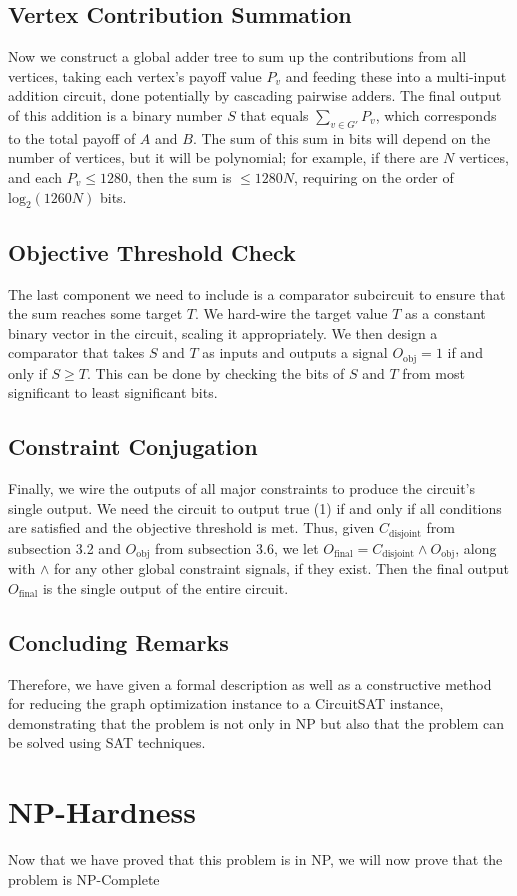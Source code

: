 \documentclass{article}
\begin{document}
\subsection{Vertex Contribution Summation}

Now we construct a global adder tree to sum up the contributions from all vertices, taking each vertex's payoff value $P_v$ and feeding these into a multi-input addition circuit, done potentially by cascading pairwise adders. The final output of this addition is a binary number $S$ that equals $\sum_{v \in G'} P_v$, which corresponds to the total payoff of $A$ and $B$. The sum of this sum in bits will depend on the number of vertices, but it will be polynomial; for example, if there are $N$ vertices, and each $P_v \leq 1280$, then the sum is $\leq 1280N$, requiring on the order of $\text{log}_2 (1260N)$ bits. 

\subsection{Objective Threshold Check}

The last component we need to include is a comparator subcircuit to ensure that the sum reaches some target $T$. We hard-wire the target value $T$ as a constant binary vector in the circuit, scaling it appropriately. We then design a comparator that takes $S$ and $T$ as inputs and outputs a signal $O_{\text{obj}} = 1$ if and only if $S \geq T$. This can be done by checking the bits of $S$ and $T$ from most significant to least significant bits. 

\subsection{Constraint Conjugation}

Finally, we wire the outputs of all major constraints to produce the circuit's single output. We need the circuit to output true (1) if and only if all conditions are satisfied and the objective threshold is met. Thus, given $C_{\text{disjoint}}$ from subsection 3.2 and $O_{\text{obj}}$ from subsection 3.6, we let $O_{\text{final}} = C_{\text{disjoint}} \land O_{\text{obj}}$, along with $\land$ for any other global constraint signals, if they exist. Then the final output $O_{\text{final}}$ is the single output of the entire circuit.

\subsection{Concluding Remarks}

Therefore, we have given a formal description as well as a constructive method for reducing the graph optimization instance to a CircuitSAT instance, demonstrating that the problem is not only in NP but also that the problem can be solved using SAT techniques.

\section{NP-Hardness}

Now that we have proved that this problem is in NP, we will now prove that the problem is NP-Complete
\end{document}
